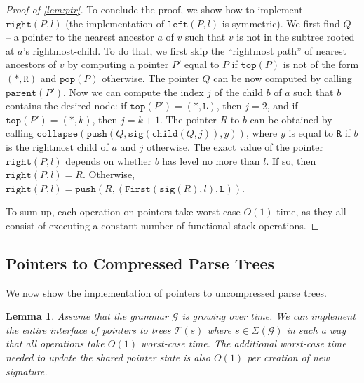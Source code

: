 \documentclass[a4paper]{article}
\newtheorem{lemma}[theorem]{Lemma}
\theoremstyle{remark}
\newcommand{\sigs}{\bar{\Sigma}}
\newcommand{\grammar}{\mathcal{G}}
\newcommand{\ustree}{\mathcal{\overline{T}}}
\newcommand{\itparent}{\mathtt{parent}}
\newcommand{\itchild}{\mathtt{child}}
\newcommand{\itleft}{\mathtt{left}}
\newcommand{\itright}{\mathtt{right}}
\newcommand{\itfirst}{\mathtt{First}}
\newcommand{\itsig}{\mathtt{sig}}
\newcommand{\stpush}{\mathtt{push}}
\newcommand{\stpop}{\mathtt{pop}}
\newcommand{\sttop}{\mathtt{top}}
\newcommand{\stcomp}{\mathtt{collapse}}
\begin{document}
\begin{proof}[Proof of \cref{lem:ptr}]
To conclude the proof, we show how to implement $\itright(P,l)$ (the implementation
of $\itleft(P,l)$ is symmetric).
We first find $Q$ -- a pointer to the nearest ancestor $a$ of $v$ such that $v$ is not in
the subtree rooted at $a$'s rightmost-child.
To do that, we first skip the ``rightmost path'' of nearest ancestors
of $v$ by computing a pointer $P'$ equal to $P$ if $\sttop(P)$ is
not of the form $(*,\texttt{R})$ and $\stpop(P)$ otherwise.
The pointer $Q$ can be now computed by calling $\itparent(P')$.
Now we can compute the index $j$ of the child $b$ of $a$ such that
$b$ contains the desired node: if $\sttop(P')=(*,\texttt{L})$, then $j=2$, and if $\sttop(P')=(*,k)$, then $j=k+1$.
The pointer $R$ to $b$ can be obtained by calling $\stcomp(\stpush(Q,\itsig(\itchild(Q,j)),y))$,
where $y$ is equal to $\texttt{R}$ if $b$ is the rightmost child
of $a$ and $j$ otherwise.
The exact value of the pointer $\itright(P,l)$ depends on whether
$b$ has level no more than $l$.
If so, then $\itright(P,l)=R$.
Otherwise, $\itright(P,l)=\stpush(R,(\itfirst(\itsig(R),l),\texttt{L}))$.

To sum up, each operation on pointers take worst-case $O(1)$ time, as they
all consist of executing a constant number of functional stack operations.
\end{proof}

\subsection{Pointers to Compressed Parse Trees}
We now show the implementation of pointers to uncompressed parse trees.

\begin{lemma}\label{lem:uptr}
Assume that the grammar $\grammar$ is growing over time.
We can implement the entire interface of pointers to trees $\ustree(s)$ where
$s\in\sigs(\grammar)$
in such a way that all operations take $O(1)$ worst-case time.
The additional worst-case time needed to update the shared pointer state is also $O(1)$ per creation of new signature.
\end{lemma}
\end{document}
